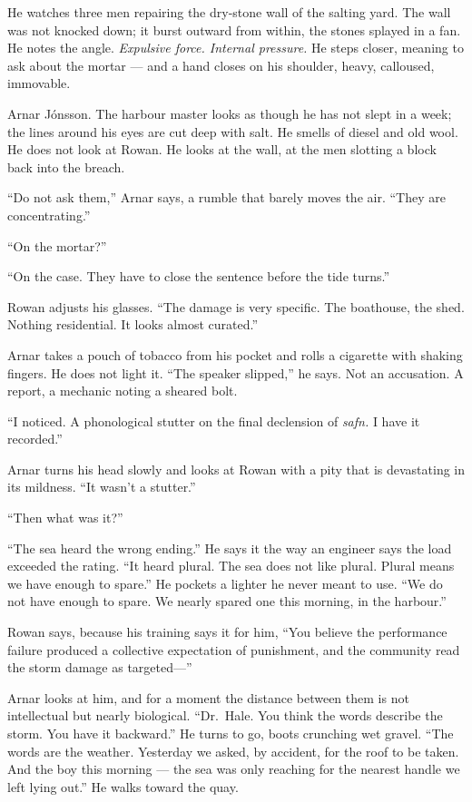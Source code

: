 \documentclass[11pt,oneside]{book}
\begin{document}
He watches three men repairing the dry-stone wall of the salting yard.
The wall was not knocked down; it burst outward from within, the stones
splayed in a fan. He notes the angle. \emph{Expulsive force. Internal
pressure.} He steps closer, meaning to ask about the mortar --- and a
hand closes on his shoulder, heavy, calloused, immovable.

Arnar Jónsson. The harbour master looks as though he has not slept in a
week; the lines around his eyes are cut deep with salt. He smells of
diesel and old wool. He does not look at Rowan. He looks at the wall, at
the men slotting a block back into the breach.

``Do not ask them,'' Arnar says, a rumble that barely moves the air.
``They are concentrating.''

``On the mortar?''

``On the case. They have to close the sentence before the tide turns.''

Rowan adjusts his glasses. ``The damage is very specific. The boathouse,
the shed. Nothing residential. It looks almost curated.''

Arnar takes a pouch of tobacco from his pocket and rolls a cigarette
with shaking fingers. He does not light it. ``The speaker slipped,'' he
says. Not an accusation. A report, a mechanic noting a sheared bolt.

``I noticed. A phonological stutter on the final declension of
\emph{safn.} I have it recorded.''

Arnar turns his head slowly and looks at Rowan with a pity that is
devastating in its mildness. ``It wasn't a stutter.''

``Then what was it?''

``The sea heard the wrong ending.'' He says it the way an engineer says
the load exceeded the rating. ``It heard plural. The sea does not like
plural. Plural means we have enough to spare.'' He pockets a lighter he
never meant to use. ``We do not have enough to spare. We nearly spared
one this morning, in the harbour.''

Rowan says, because his training says it for him, ``You believe the
performance failure produced a collective expectation of punishment, and
the community read the storm damage as targeted---''

Arnar looks at him, and for a moment the distance between them is not
intellectual but nearly biological. ``Dr.~Hale. You think the words
describe the storm. You have it backward.'' He turns to go, boots
crunching wet gravel. ``The words are the weather. Yesterday we asked,
by accident, for the roof to be taken. And the boy this morning --- the
sea was only reaching for the nearest handle we left lying out.'' He
walks toward the quay.
\end{document}
